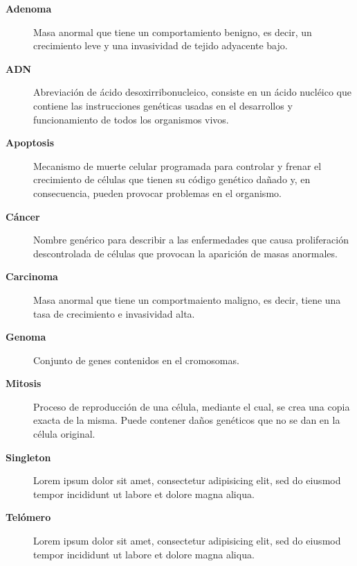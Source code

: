 \begin{description}
    \item[\textbf{Adenoma}] Masa anormal que tiene un comportamiento benigno, es decir, un crecimiento leve y una invasividad de tejido adyacente bajo.
    \item[\textbf{ADN}] Abreviación de ácido desoxirribonucleico, consiste en un ácido nucléico que contiene las instrucciones genéticas usadas en el desarrollos y funcionamiento de todos los organismos vivos.
    \item[\textbf{Apoptosis}] Mecanismo de muerte celular programada para controlar y frenar el crecimiento de células que tienen su código genético dañado y, en consecuencia, pueden provocar problemas en el organismo.
    \item[\textbf{Cáncer}] Nombre genérico para describir a las enfermedades que causa proliferación descontrolada de células que provocan la aparición de masas anormales.
    \item[\textbf{Carcinoma}] Masa anormal que tiene un comportmaiento maligno, es decir, tiene una tasa de crecimiento e invasividad alta.
    \item[\textbf{Genoma}] Conjunto de genes contenidos en el cromosomas.
    \item[\textbf{Mitosis}] Proceso de reproducción de una célula, mediante el cual, se crea una copia exacta de la misma. Puede contener daños genéticos que no se dan en la célula original.
    \item[\textbf{Singleton}] Lorem ipsum dolor sit amet, consectetur adipisicing elit, sed do eiusmod tempor incididunt ut labore et dolore magna aliqua.
    \item[\textbf{Telómero}] Lorem ipsum dolor sit amet, consectetur adipisicing elit, sed do eiusmod tempor incididunt ut labore et dolore magna aliqua.
\end{description}
